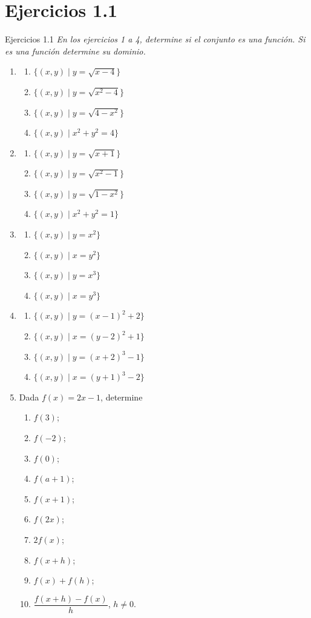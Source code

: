 \documentclass[aspectratio=169,10pt]{beamer}
\begin{document}
\section{Ejercicios 1.1}
\begin{frame}{Ejercicios 1.1}
\textit{En los ejercicios 1 a 4, determine si el conjunto es una función. Si es una función determine su dominio.}

\begin{enumerate}
\item
\begin{enumerate}
\item $\{(x,y)\mid y=\sqrt{x-4}\}$
\item $\{(x,y)\mid y=\sqrt{x^2-4}\}$
\item $\{(x,y)\mid y=\sqrt{4-x^2}\}$
\item $\{(x,y)\mid x^2+y^2=4\}$
\end{enumerate}

\item
\begin{enumerate}
\item $\{(x,y)\mid y=\sqrt{x+1}\}$
\item $\{(x,y)\mid y=\sqrt{x^2-1}\}$
\item $\{(x,y)\mid y=\sqrt{1-x^2}\}$
\item $\{(x,y)\mid x^2+y^2=1\}$
\end{enumerate}

\item
\begin{enumerate}
\item $\{(x,y)\mid y=x^2\}$
\item $\{(x,y)\mid x=y^2\}$
\item $\{(x,y)\mid y=x^3\}$
\item $\{(x,y)\mid x=y^3\}$
\end{enumerate}

\item
\begin{enumerate}
\item $\{(x,y)\mid y=(x-1)^2+2\}$
\item $\{(x,y)\mid x=(y-2)^2+1\}$
\item $\{(x,y)\mid y=(x+2)^3-1\}$
\item $\{(x,y)\mid x=(y+1)^3-2\}$
\end{enumerate}

\item Dada $f(x)=2x-1$, determine
\begin{enumerate}
\item $f(3)$; \item $f(-2)$; \item $f(0)$; \item $f(a+1)$; \item $f(x+1)$;
\item $f(2x)$; \item $2f(x)$; \item $f(x+h)$; \item $f(x)+f(h)$;
\item $\dfrac{f(x+h)-f(x)}{h}$, $h\ne0$.
\end{enumerate}


\end{enumerate}
\end{frame}
\end{document}

